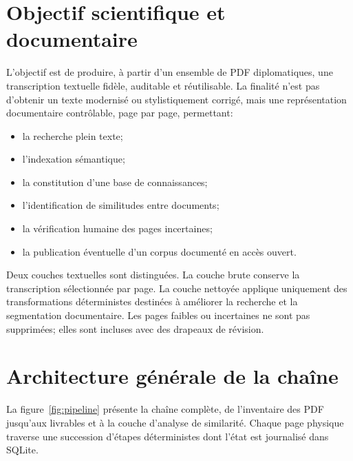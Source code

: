 \documentclass[11pt,a4paper]{article}
\begin{document}
\section{Objectif scientifique et documentaire}

L'objectif est de produire, à partir d'un ensemble de PDF diplomatiques, une transcription textuelle fidèle, auditable et réutilisable. La finalité n'est pas d'obtenir un texte modernisé ou stylistiquement corrigé, mais une représentation documentaire contrôlable, page par page, permettant:

\begin{itemize}
  \item la recherche plein texte;
  \item l'indexation sémantique;
  \item la constitution d'une base de connaissances;
  \item l'identification de similitudes entre documents;
  \item la vérification humaine des pages incertaines;
  \item la publication éventuelle d'un corpus documenté en accès ouvert.
\end{itemize}

Deux couches textuelles sont distinguées. La couche brute conserve la transcription sélectionnée par page. La couche nettoyée applique uniquement des transformations déterministes destinées à améliorer la recherche et la segmentation documentaire. Les pages faibles ou incertaines ne sont pas supprimées; elles sont incluses avec des drapeaux de révision.

\section{Architecture générale de la chaîne}

La figure~\ref{fig:pipeline} présente la chaîne complète, de l'inventaire des PDF jusqu'aux livrables et à la couche d'analyse de similarité. Chaque page physique traverse une succession d'étapes déterministes dont l'état est journalisé dans SQLite.
\end{document}
